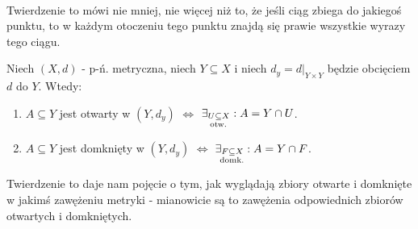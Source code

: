 \documentclass{article}
\numberwithin{defi}{section}
\numberwithin{defi}{section}
\newcommand{\subotw}{\underset{\clap{\scriptsize otw.}}{\subseteq}}
\newcommand{\subdomk}{\underset{\clap{\scriptsize domk.}}{\subseteq}}
\begin{document}
\paragraph*{} Twierdzenie to mówi nie mniej, nie więcej niż to, że jeśli ciąg zbiega do jakiegoś punktu, to w każdym otoczeniu tego punktu znajdą się prawie wszystkie wyrazy tego ciągu.

\begin{twier}{}
    Niech $(X, d)$ - p-ń. metryczna, niech $Y \subseteq X$ i niech $d_y = d | _{Y \times Y}$ będzie obcięciem $d$ do $Y$. Wtedy:
    \begin{enumerate}
        \item $A \subseteq Y$ jest otwarty w $(Y, d_y)$ $\iff$ $\exists_{U \subotw X}: A = Y \cap U$.
        \item $A \subseteq Y$ jest domknięty w $(Y, d_y)$ $\iff$ $\exists_{F \subdomk X}: A = Y \cap F$.
    \end{enumerate}
\end{twier}
Twierdzenie to daje nam pojęcie o tym, jak wyglądają zbiory otwarte i domknięte w jakimś zawężeniu metryki - mianowicie są to zawężenia odpowiednich zbiorów otwartych i domkniętych.
\end{document}
